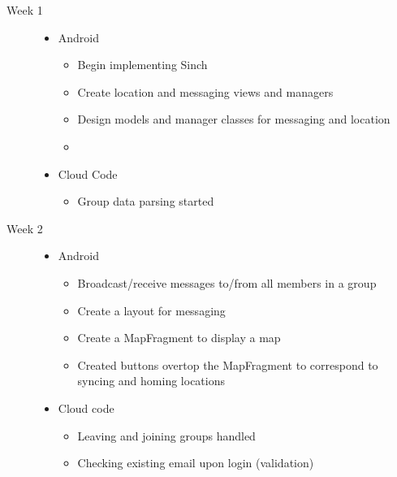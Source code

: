 \documentclass[11pt]{article}
\begin{document}
\begin{description}
	\item[Week 1] \hfill
		\begin{itemize}
		\item Android
		\begin{itemize}
			\item Begin implementing Sinch
			\item Create location and messaging views and managers
			\item Design models and manager classes for messaging and location
			\item
		\end{itemize}
		\item Cloud Code
		\begin{itemize}
			\item Group data parsing started
		\end{itemize}
	\end{itemize}
	
  \item[Week 2] \hfill
		\begin{itemize}
		\item Android
		\begin{itemize}
			\item Broadcast/receive messages to/from all members in a group
			\item Create a layout for messaging
			\item Create a MapFragment to display a map
			\item Created buttons overtop the MapFragment to correspond to syncing and homing locations
		\end{itemize}
		\item Cloud code
		\begin{itemize}
			\item Leaving and joining groups handled
			\item Checking existing email upon login (validation)
		\end{itemize}
	\end{itemize}
  

\end{description}
\end{document}
